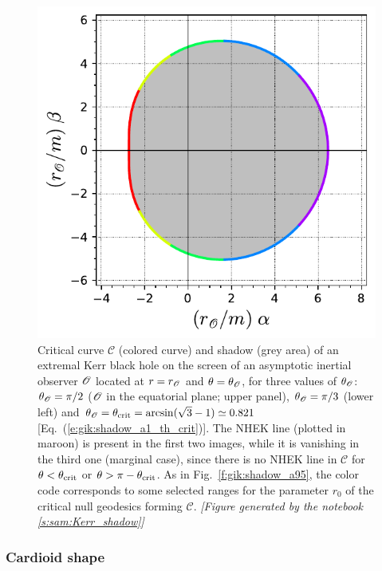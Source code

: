 \begin{figure}
\begin{center}
\includegraphics[height=0.28\textheight]{gik_shadow_a1_th_crit.pdf}
\end{center}
\caption[]{\label{f:gik:shadow_a1} \footnotesize
Critical curve $\mathscr{C}$ (colored curve) and shadow (grey area)
of an extremal Kerr black hole on the screen of an asymptotic
inertial observer $\mathscr{O}$ located at $r=r_{\mathscr{O}}$ and $\theta=\theta_{\mathscr{O}}$, for three
values of $\theta_{\mathscr{O}}$: $\theta_{\mathscr{O}} = \pi/2$ ($\mathscr{O}$ in the equatorial plane; upper panel),
$\theta_{\mathscr{O}} = \pi/3$ (lower left) and $\theta_{\mathscr{O}} = \theta_{\rm crit} = \arcsin(\sqrt{3} - 1) \simeq 0.821$
[Eq.~(\ref{e:gik:shadow_a1_th_crit})]. The NHEK line (plotted in maroon) is present in
the first two images, while
it is vanishing in the third one (marginal case), since there is no NHEK line in $\mathscr{C}$ for $\theta < \theta_{\rm crit}$ or $\theta > \pi -  \theta_{\rm crit}$.
As in Fig.~\ref{f:gik:shadow_a95},
the color code corresponds to some selected ranges for the parameter $r_0$
of the critical null geodesics forming $\mathscr{C}$.
\textsl{[Figure generated by the notebook \ref{s:sam:Kerr_shadow}]}
}
\end{figure}

\subsubsection{Cardioid shape}

